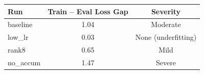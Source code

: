 \begin{tabular}{@{}lcc@{}}
\toprule
\textbf{Run} & \textbf{Train -- Eval Loss Gap} & \textbf{Severity} \\
\midrule
baseline  & 1.04 & Moderate \\
low\_lr   & 0.03 & None (underfitting) \\
rank8     & 0.65 & Mild \\
no\_accum & 1.47 & Severe \\
\bottomrule
\end{tabular}
